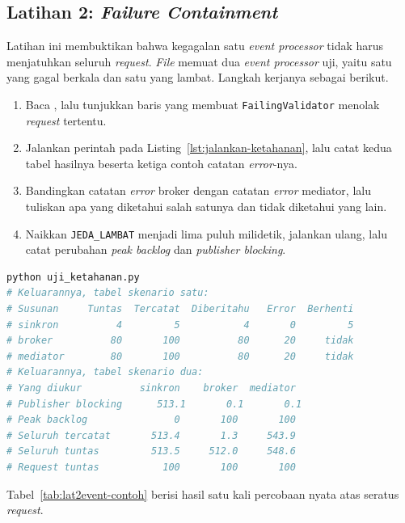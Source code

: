 \subsection*{Latihan 2: \textit{Failure Containment}}

Latihan ini membuktikan bahwa kegagalan satu \textit{event processor} tidak harus menjatuhkan
seluruh \textit{request}. \textit{File}  memuat dua
\textit{event processor} uji, yaitu satu yang gagal berkala dan satu yang lambat. Langkah
kerjanya sebagai berikut.

\begin{enumerate}
  \item Baca , lalu tunjukkan baris yang
    membuat \texttt{FailingValidator} menolak \textit{request} tertentu.
  \item Jalankan perintah pada Listing~\ref{lst:jalankan-ketahanan}, lalu
    catat kedua tabel hasilnya beserta ketiga contoh catatan \textit{error}-nya.
  \item Bandingkan catatan \textit{error} broker dengan catatan \textit{error} mediator, lalu
    tuliskan apa yang diketahui salah satunya dan tidak diketahui yang lain.
  \item Naikkan \texttt{JEDA\_LAMBAT} menjadi lima puluh milidetik, jalankan
    ulang, lalu catat perubahan \textit{peak backlog} dan \textit{publisher blocking}.
\end{enumerate}

\begin{lstlisting}[language=bash, caption={Mengukur \textit{failure
  containment}, skrip tersedia di
  \berkas{sources/chapter09/uji_ketahanan.py}}, label=lst:jalankan-ketahanan]
python uji_ketahanan.py
# Keluarannya, tabel skenario satu:
# Susunan     Tuntas  Tercatat  Diberitahu   Error  Berhenti
# sinkron          4         5           4       0         5
# broker          80       100          80      20     tidak
# mediator        80       100          80      20     tidak
# Keluarannya, tabel skenario dua:
# Yang diukur          sinkron    broker  mediator
# Publisher blocking      513.1       0.1       0.1
# Peak backlog               0       100       100
# Seluruh tercatat       513.4       1.3     543.9
# Seluruh tuntas         513.5     512.0     548.6
# Request tuntas           100       100       100
\end{lstlisting}

Tabel~\ref{tab:lat2event-contoh} berisi hasil satu kali percobaan nyata atas
seratus \textit{request}.

